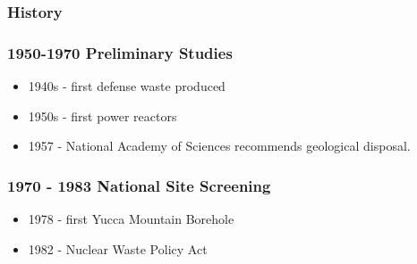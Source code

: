 
\begin{frame}[ctb!]
  \frametitle{History}
  
\end{frame}
\begin{frame}[ctb!]
  \frametitle{1950-1970 Preliminary Studies}
  \begin{itemize}
    \item 1940s - first defense waste produced
    \item 1950s - first power reactors
    \item 1957 - National Academy of Sciences recommends geological disposal.
  \end{itemize}
\end{frame}

\begin{frame}[ctb!]
  \frametitle{1970 - 1983 National Site Screening}
  \begin{itemize}
    \item 1978 - first Yucca Mountain Borehole
    \item 1982 - Nuclear Waste Policy Act
  \end{itemize}
\end{frame}

